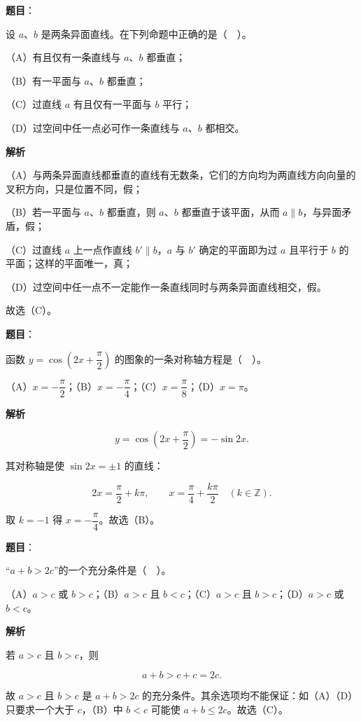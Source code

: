 \begin{answer}

\textbf{题目}：

设 $a$、$b$ 是两条异面直线。在下列命题中正确的是（　）。

（A）有且仅有一条直线与 $a$、$b$ 都垂直；

（B）有一平面与 $a$、$b$ 都垂直；

（C）过直线 $a$ 有且仅有一平面与 $b$ 平行；

（D）过空间中任一点必可作一条直线与 $a$、$b$ 都相交。

\textbf{解析}

（A）与两条异面直线都垂直的直线有无数条，它们的方向均为两直线方向向量的叉积方向，只是位置不同，假；

（B）若一平面与 $a$、$b$ 都垂直，则 $a$、$b$ 都垂直于该平面，从而 $a\parallel b$，与异面矛盾，假；

（C）过直线 $a$ 上一点作直线 $b'\parallel b$，$a$ 与 $b'$ 确定的平面即为过 $a$ 且平行于 $b$ 的平面；这样的平面唯一，真；

（D）过空间中任一点不一定能作一条直线同时与两条异面直线相交，假。

故选（C）。


\end{answer}
\begin{answer}

\textbf{题目}：

函数 $y=\cos\left(2x+\dfrac{\pi}{2}\right)$ 的图象的一条对称轴方程是（　）。

（A）$x=-\dfrac{\pi}{2}$；（B）$x=-\dfrac{\pi}{4}$；（C）$x=\dfrac{\pi}{8}$；（D）$x=\pi$。

\textbf{解析}

\nopagebreak[4]
\[
y=\cos\left(2x+\frac{\pi}{2}\right)=-\sin 2x.
\]

其对称轴是使 $\sin 2x=\pm1$ 的直线：

\nopagebreak[4]
\[
2x=\frac{\pi}{2}+k\pi,\qquad x=\frac{\pi}{4}+\frac{k\pi}{2}\quad(k\in\mathbb Z).
\]

取 $k=-1$ 得 $x=-\dfrac{\pi}{4}$。故选（B）。


\end{answer}
\begin{answer}

\textbf{题目}：

“$a+b>2c$”的一个充分条件是（　）。

（A）$a>c$ 或 $b>c$；（B）$a>c$ 且 $b<c$；（C）$a>c$ 且 $b>c$；（D）$a>c$ 或 $b<c$。

\textbf{解析}

若 $a>c$ 且 $b>c$，则

\nopagebreak[4]
\[
a+b>c+c=2c.
\]

故 $a>c$ 且 $b>c$ 是 $a+b>2c$ 的充分条件。其余选项均不能保证：如（A）（D）只要求一个大于 $c$，（B）中 $b<c$ 可能使 $a+b\le 2c$。故选（C）。


\end{answer}

